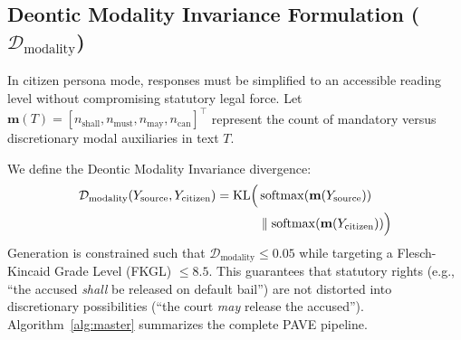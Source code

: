 \documentclass[conference]{IEEEtran}
\begin{document}
\subsection{Deontic Modality Invariance Formulation ($\mathcal{D}_{\text{modality}}$)}
In citizen persona mode, responses must be simplified to an accessible reading level without compromising statutory legal force. Let $\mathbf{m}(T) = [n_{\text{shall}}, n_{\text{must}}, n_{\text{may}}, n_{\text{can}}]^\top$ represent the count of mandatory versus discretionary modal auxiliaries in text $T$. 

We define the Deontic Modality Invariance divergence:
\begin{equation}
\begin{aligned}
\mathcal{D}_{\text{modality}}(Y_{\text{source}}, Y_{\text{citizen}}) = \operatorname{KL}\Bigl( &\operatorname{softmax}(\mathbf{m}(Y_{\text{source}})) \\
&\parallel \operatorname{softmax}(\mathbf{m}(Y_{\text{citizen}})) \Bigr)
\end{aligned}
\end{equation}
Generation is constrained such that $\mathcal{D}_{\text{modality}} \le 0.05$ while targeting a Flesch-Kincaid Grade Level (FKGL) $\le 8.5$. This guarantees that statutory rights (e.g., ``the accused \textit{shall} be released on default bail'') are not distorted into discretionary possibilities (``the court \textit{may} release the accused''). Algorithm~\ref{alg:master} summarizes the complete PAVE pipeline.
\end{document}

